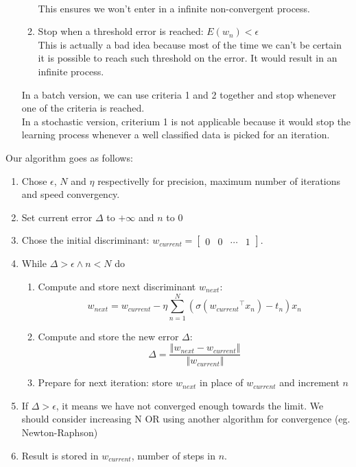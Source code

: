 \documentclass[a4paper, 10pt]{article}
\begin{document}
\begin{itemize}[label=$\square$]
\begin{enumerate}
    \\
    This ensures we won't enter in a infinite non-convergent process. 
    \item Stop when a threshold error is reached: $E(w_n) < \epsilon $
    \\
    This is actually a bad idea because most of the time we can't be certain it is possible to reach such threshold on the error.
    It would result in an infinite process.
    \end{enumerate}
    In a batch version, we can use criteria 1 and 2 together and stop whenever one of 
    the criteria is reached.
    \\
    In a stochastic version, criterium 1 is not applicable because it would stop the learning process whenever a well classified data
    is picked for an iteration.
\end{itemize}

Our algorithm goes as follows:
\begin{enumerate}
    \item Chose $\epsilon$, $N$ and $\eta$ respectivelly for precision, maximum number of iterations and speed convergency.
    \item Set current error $\Delta$ to $+\infty$ and $n$ to $0$
    \item Chose the initial discriminant: $w_{current} = \begin{bmatrix}0 & 0 & \cdots & 1\end{bmatrix}$.
    \item While $\Delta > \epsilon \wedge n < N$ do
    \begin{enumerate}
        \item Compute and store next discriminant $w_{next}$:
$$
w_{next} = w_{current} - \eta \sum_{n=1}^{N}\left(\sigma({w_{current}}^\top x_n)-t_n\right)x_n
$$
        \item Compute and store the new error $\Delta$:
$$
\Delta = \frac{\left\Vert w_{next} - w_{current}\right\Vert}{\left\Vert w_{current} \right\Vert}
$$
        \item Prepare for next iteration: store $w_{next}$ in place of $w_{current}$ and increment $n$
    \end{enumerate}
    \item If $\Delta > \epsilon$, it means we have not converged enough towards the limit. We should consider increasing N OR using another algorithm for convergence (eg. Newton-Raphson)
    \item Result is stored in $w_{current}$, number of steps in $n$. 
\end{enumerate}
\end{document}
